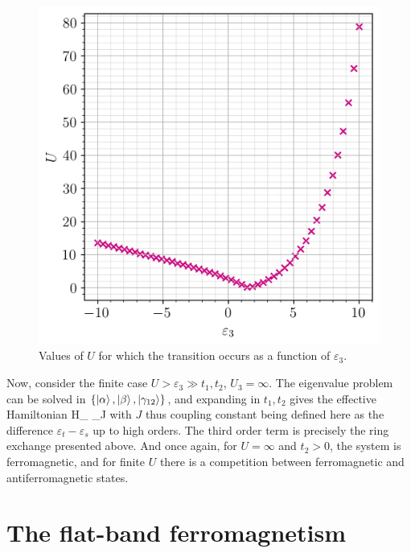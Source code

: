         \begin{figure}[h!]
            \centering
            \includegraphics[scale=0.65]{graphs/cross.png}
            \caption{Values of $U$ for which the transition occurs as a function of $\varepsilon_3$.}
            \label{fig:cross}
        \end{figure}

        Now, consider the finite case $U>\varepsilon_3 \gg t_1, t_2$, $U_3 = \infty$. The eigenvalue problem can be solved in $\{\ket \alpha ,\ket \beta, \ket{\gamma_{12}} \}$, and expanding in $t_1,t_2$ gives the effective Hamiltonian
        \be \mc H_ \simeq {}_{J}  \cdot {} \ee
        with $J$ thus coupling constant being defined here as the difference $\varepsilon_t - \varepsilon_s$ up to high orders. The third order term is precisely the ring exchange presented above. And once again, for $U=\infty$ and $t_2>0$, the system is ferromagnetic, and for finite $U$ there is a competition between ferromagnetic and antiferromagnetic states.   
            
    \section{The flat-band ferromagnetism}

